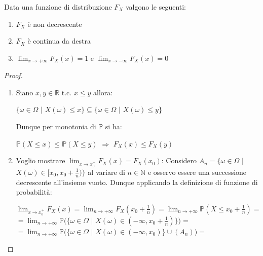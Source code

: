 \begin{theorem}
    Data una funzione di distribuzione $F_X$ valgono le seguenti:
    \begin{enumerate}
        \item $F_X$ è non decrescente
        \item $F_X$ è continua da destra
        \item  $\lim_{x\to+\infty} F_X(x) = 1$ e $\lim_{x\to-\infty} F_X(x) = 0$
    \end{enumerate}
\begin{proof}
\begin{enumerate}
    \item Siano $x,y\in\mathbb{R}$ t.c. $x\leq y$ allora:
    \begin{center}
        $\{\omega\in\Omega$ $|$ $X(\omega)\leq x\} \subseteq \{\omega\in\Omega$ $|$ $X(\omega)\leq y\}$
    \end{center}
    Dunque per monotonia di $\mathbb{P}$ si ha:
    \begin{center}
        $\mathbb{P}(X\leq x)\leq\mathbb{P}(X\leq y)$
        \hspace{4px}
        $\Rightarrow$
        \hspace{4px}
        $F_X(x)\leq F_X(y)$
    \end{center}
    \item Voglio mostrare $\lim_{x\to x_0^+} F_X(x) = F_X(x_0)$:
    \vspace{10px}
    \newline
    \noindent
    Considero $A_n=\{\omega\in\Omega$ $|$ $X(\omega)\in[x_0,x_0+\frac{1}{n})\}$ al variare di $n\in\mathbb{N}$ e osservo essere una successione decrescente all'insieme vuoto. 
    \vspace{10px}
    \newline
    \noindent
    Dunque applicando la definizione di funzione di probabilità:
    \begin{center}
        $\lim_{x\to x_0^+} F_X(x)=\lim_{n\to+\infty} F_X(x_0+\frac{1}{n})=\lim_{n\to+\infty}\mathbb{P}(X\leq x_0+\frac{1}{n})=$
        \vspace{5px}
        \newline
        $=\lim_{n\to+\infty}\mathbb{P}(\{\omega\in\Omega$ $|$ $X(\omega)\in(-\infty,x_0+\frac{1}{n})\})=$
        \vspace{5px}
        \newline
        $=\lim_{n\to+\infty}\mathbb{P}(\{\omega\in\Omega$ $|$ $X(\omega)\in(-\infty,x_0)\}\cup(A_n))=$
        \vspace{5px}

\end{center}
\end{enumerate}
\end{proof}
\end{theorem}
